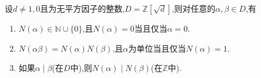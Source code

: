 \documentclass[../../main.tex]{subfiles}%
\begin{document}
\begin{theorem}\label{theorem:抽象代数--范数的基本性质}
设$d \neq 1,0$且为无平方因子的整数,$D = \mathbb{Z}[\sqrt{d}]$,则对任意的$\alpha,\beta \in D$,有
\begin{enumerate}[(1)]
\item\label{theorem:抽象代数--范数的基本性质-1} $N(\alpha) \in \mathbb{N} \cup \{0\}$,且$N(\alpha) = 0$当且仅当$\alpha = 0$.

\item\label{theorem:抽象代数--范数的基本性质-2} $N(\alpha\beta) = N(\alpha)N(\beta)$,且$\alpha$为单位当且仅当$N(\alpha)=1$.

\item\label{theorem:抽象代数--范数的基本性质-3} 如果$\alpha \mid \beta$(在$D$中),则$N(\alpha) \mid N(\beta)$(在$\mathbb{Z}$中).
\end{enumerate}
\end{theorem}
\end{document}
